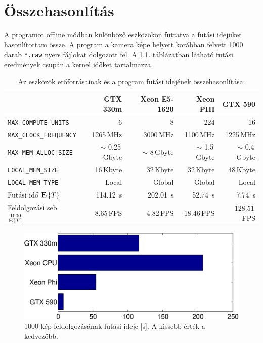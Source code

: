 \chapter{Összehasonlítás}

	A programot offline módban különböző eszközökön futtatva a futási idejüket hasonlítottam össze.
	A program a kamera képe helyett korábban felvett 1000 darab \texttt{*.raw} nyers fájlokat dolgozott fel.
	A \ref{table:results}. táblázatban látható futási eredmények csupán a kernel időket tartalmazza.
	
	\begin{table}[H]
	\footnotesize
	\centering
	
	\setlength{\extrarowheight}{3.5pt}
	\begin{tabular}{ l | r | r | r | r}
		 & GTX 330m & Xeon E5-1620 & Xeon PHI & GTX 590\\ \hline
		\texttt{MAX\_COMPUTE\_UNITS} & 6 & 8 & 224 & 16\\
		\texttt{MAX\_CLOCK\_FREQUENCY} & 1265\,MHz & 3000\,MHz & 1100\,MHz & 1225\,MHz\\
		\texttt{MAX\_MEM\_ALLOC\_SIZE} & $\sim$ 0.25\,Gbyte & $\sim$ 8\,Gbyte & $\sim$ 1.5\,Gbyte & $\sim$ 0.4\,Gbyte\\
		\texttt{LOCAL\_MEM\_SIZE} & 16\,Kbyte & 32\,Kbyte & 32\,Kbyte & 48\,Kbyte\\
		\texttt{LOCAL\_MEM\_TYPE} & Local & Global & Global & Local\\\hline
		Futási idő ${\mathop{\bf E\/}\left\{T\right\}}$ & 114.12~s & 202.01~s & 52.74~s & 7.74~s\\
		Feldolgozási seb. $\frac{1000}{{\mathop{\bf E\/}\left\{T\right\}}}$ & 8.65\,FPS & 4.82\,FPS & 18.46\,FPS & 128.51\,FPS
	\end{tabular}
	
	\caption[Az eszközökön a program futási idejének összehasonlítása.]{Az eszközök erőforrásainak és a program
	futási idejének összehasonlítása.}
	\label{table:results}
	\end{table}
	
	\begin{figure}[!h]
	\begin{center}
	  \includegraphics[width=0.9\columnwidth]{figures/eps/runtime.eps}
	  \caption[1000 kép feldolgozásának futási ideje.]{1000 kép feldolgozásának futási ideje [s]. A kissebb érték a kedvezőbb.}
	  \label{fig:runtime}
	\end{center}
	\end{figure}
	

